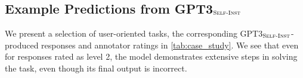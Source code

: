 \documentclass[11pt]{article}
\newcommand{\todo}[1]{{\color{red} [TODO: {#1}]}}
\newcommand{\nascomment}[1]{\textcolor{blue}{\textbf{[#1 -- \textsc{nas}]}}}
\newcommand{\name}{\textsc{Self-Instruct}}
\newcommand{\gptself}{\textsc{GPT3}$_{\textsc{Self-Inst}}$}
\begin{document}
\subsection{Example Predictions from \gptself{}}
\label{sec:example-predictions}
We present a selection of user-oriented tasks, the corresponding \gptself{}-produced responses and annotator ratings in \autoref{tab:case_study}. %
We see that even for responses rated as level 2, the model demonstrates extensive steps in solving the task, even though its final output is incorrect. 









\end{document}

